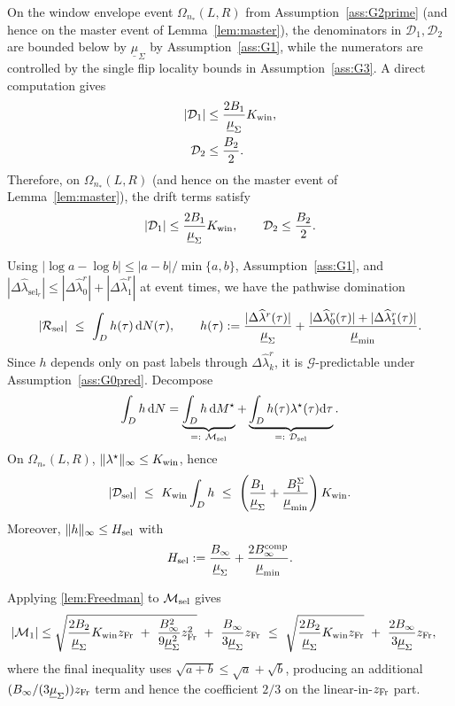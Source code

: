 \documentclass{statsoc}
\newcommand{\dd}{\mathrm{d}}
\newcommand{\1}{\mathbbm{1}}
\begin{document}
On the window envelope event $\Omega_{n_*}(L,R)$ from Assumption~\ref{ass:G2prime} (and hence on the master event of Lemma~\ref{lem:master}), the denominators in $\mathcal D_1,\mathcal D_2$ are bounded below by $\underline\mu_\Sigma$ by Assumption~\ref{ass:G1}, while the numerators are controlled by the single flip locality bounds in Assumption~\ref{ass:G3}. A direct computation gives
\begin{align}
|\mathcal D_1|
&\le\frac{2B_1}{\underline\mu_\Sigma} K_{\rm win}, \notag\\
\mathcal D_2
&\le\frac{B_2}{2}. \notag
\end{align}
Therefore, on $\Omega_{n_*}(L,R)$ (and hence on the master event of Lemma~\ref{lem:master}), the drift terms satisfy
\begin{align}
|\mathcal D_1| \le \frac{2B_1}{\underline\mu_\Sigma} K_{\rm win},\qquad
\mathcal D_2 \le \frac{B_2}{2}.
\label{eq:drift-bnds}
\end{align}

Using $| \log a-\log b|\le |a-b|/\min\{a,b\}$, Assumption~\ref{ass:G1}, and $|\Delta\widehat\lambda_{\mathrm{sel}_r}|\le |\Delta\widehat\lambda_0^r|+|\Delta\widehat\lambda_1^r|$ at event times, we have the pathwise domination
\[
|\mathcal R_{\rm sel}|
\ \le\ \int_D h(\tau)\,\dd N(\tau),
\qquad
h(\tau):=\frac{|\Delta\widehat\lambda^r(\tau)|}{\underline\mu_\Sigma}+\frac{|\Delta\widehat\lambda_0^r(\tau)|+|\Delta\widehat\lambda_1^r(\tau)|}{\underline\mu_{\min}}.
\]
Since $h$ depends only on past labels through $\Delta\widehat\lambda_k^r$, it is $\mathcal G$-predictable under Assumption~\ref{ass:G0pred}. Decompose
\[
\int_D h\,\dd N=\underbrace{\int_D h\,\dd M^\star}_{=:\ \mathcal M_{\rm sel}}+\underbrace{\int_D h(\tau)\lambda^\star(\tau)\dd\tau}_{=:\ \mathcal D_{\rm sel}}.
\]
On $\Omega_{n_*}(L,R)$, $\|\lambda^\star\|_\infty\le K_{\rm win}$, hence
\[
|\mathcal D_{\rm sel}|
\ \le\ K_{\rm win}\int_D h
\ \le\ \left(\frac{B_1}{\underline\mu_\Sigma}+\frac{B_1^\Sigma}{\underline\mu_{\min}}\right)K_{\rm win}.
\]
Moreover, $\|h\|_\infty\le H_{\rm sel}$ with
\[
H_{\rm sel}:=\frac{B_\infty}{\underline\mu_\Sigma}+\frac{2B_\infty^{\rm comp}}{\underline\mu_{\min}}.
\]

Applying \cref{lem:Freedman} to $\mathcal M_{\rm sel}$ gives
\begin{align}
|\mathcal M_1|
&\le \sqrt{ \frac{2B_2}{\underline\mu_\Sigma} K_{\rm win} z_{\rm Fr}\ +\ \frac{B_\infty^2}{9\underline\mu_\Sigma^2} z_{\rm Fr}^2 }\ +\ \frac{B_\infty}{3\underline\mu_\Sigma} z_{\rm Fr}
\ \le\ \sqrt{\frac{2B_2}{\underline\mu_\Sigma} K_{\rm win} z_{\rm Fr}}\ +\ \frac{2B_\infty}{3\underline\mu_\Sigma} z_{\rm Fr},\label{eq:mtg1-bnd}
\end{align}
where the final inequality uses $\sqrt{a+b}\le \sqrt a+\sqrt b$, producing an additional $(B_\infty/(3\underline\mu_\Sigma))z_{\rm Fr}$ term and hence the coefficient $2/3$ on the linear-in-$z_{\rm Fr}$ part.
\end{document}
